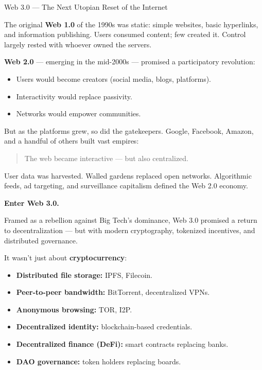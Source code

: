 \begin{HistoricalSidebar}{Web 3.0 --- The Next Utopian Reset of the Internet}

    The original \textbf{Web 1.0} of the 1990s was static: simple websites, basic hyperlinks, and information publishing. Users consumed content; few created it. Control largely rested with whoever owned the servers.
    
    \medskip
    
    \textbf{Web 2.0} — emerging in the mid-2000s — promised a participatory revolution:  
    \begin{itemize}
    \item Users would become creators (social media, blogs, platforms).
    \item Interactivity would replace passivity.
    \item Networks would empower communities.
    \end{itemize}
    
    But as the platforms grew, so did the gatekeepers.  
    Google, Facebook, Amazon, and a handful of others built vast empires:
    
    \begin{quote}
    The web became interactive — but also centralized.
    \end{quote}
    
    User data was harvested. Walled gardens replaced open networks. Algorithmic feeds, ad targeting, and surveillance capitalism defined the Web 2.0 economy.
    
    \medskip
    
    \textbf{Enter Web 3.0.}
    
    \medskip
    
    Framed as a rebellion against Big Tech’s dominance, Web 3.0 promised a return to decentralization — but with modern cryptography, tokenized incentives, and distributed governance.
    
    \medskip
    
    It wasn’t just about \textbf{cryptocurrency}:
    
    \begin{itemize}
    \item \textbf{Distributed file storage:} IPFS, Filecoin.
    \item \textbf{Peer-to-peer bandwidth:} BitTorrent, decentralized VPNs.
    \item \textbf{Anonymous browsing:} TOR, I2P.
    \item \textbf{Decentralized identity:} blockchain-based credentials.
    \item \textbf{Decentralized finance (DeFi):} smart contracts replacing banks.
    \item \textbf{DAO governance:} token holders replacing boards.
    \end{itemize}
    

\end{HistoricalSidebar}
